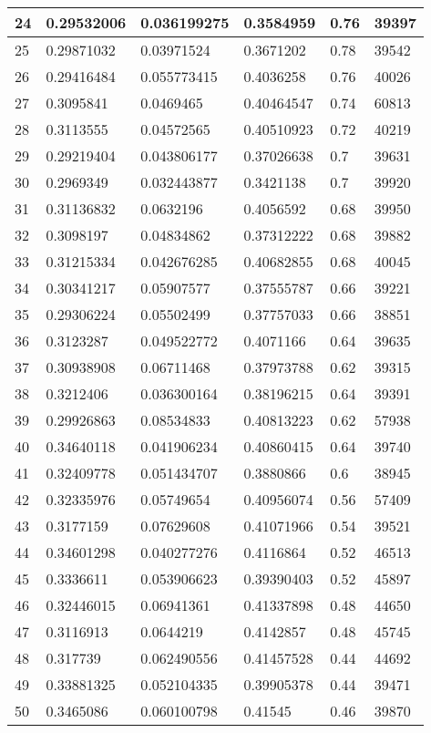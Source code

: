 \begin{longtable}{|l|l|l|l|l|l|}
24 & 0.29532006 & 0.036199275 & 0.3584959 & 0.76 & 39397 \\ \hline 
25 & 0.29871032 & 0.03971524 & 0.3671202 & 0.78 & 39542 \\ \hline 
26 & 0.29416484 & 0.055773415 & 0.4036258 & 0.76 & 40026 \\ \hline 
27 & 0.3095841 & 0.0469465 & 0.40464547 & 0.74 & 60813 \\ \hline 
28 & 0.3113555 & 0.04572565 & 0.40510923 & 0.72 & 40219 \\ \hline 
29 & 0.29219404 & 0.043806177 & 0.37026638 & 0.7 & 39631 \\ \hline 
30 & 0.2969349 & 0.032443877 & 0.3421138 & 0.7 & 39920 \\ \hline 
31 & 0.31136832 & 0.0632196 & 0.4056592 & 0.68 & 39950 \\ \hline 
32 & 0.3098197 & 0.04834862 & 0.37312222 & 0.68 & 39882 \\ \hline 
33 & 0.31215334 & 0.042676285 & 0.40682855 & 0.68 & 40045 \\ \hline 
34 & 0.30341217 & 0.05907577 & 0.37555787 & 0.66 & 39221 \\ \hline 
35 & 0.29306224 & 0.05502499 & 0.37757033 & 0.66 & 38851 \\ \hline 
36 & 0.3123287 & 0.049522772 & 0.4071166 & 0.64 & 39635 \\ \hline 
37 & 0.30938908 & 0.06711468 & 0.37973788 & 0.62 & 39315 \\ \hline 
38 & 0.3212406 & 0.036300164 & 0.38196215 & 0.64 & 39391 \\ \hline 
39 & 0.29926863 & 0.08534833 & 0.40813223 & 0.62 & 57938 \\ \hline 
40 & 0.34640118 & 0.041906234 & 0.40860415 & 0.64 & 39740 \\ \hline 
41 & 0.32409778 & 0.051434707 & 0.3880866 & 0.6 & 38945 \\ \hline 
42 & 0.32335976 & 0.05749654 & 0.40956074 & 0.56 & 57409 \\ \hline 
43 & 0.3177159 & 0.07629608 & 0.41071966 & 0.54 & 39521 \\ \hline 
44 & 0.34601298 & 0.040277276 & 0.4116864 & 0.52 & 46513 \\ \hline 
45 & 0.3336611 & 0.053906623 & 0.39390403 & 0.52 & 45897 \\ \hline 
46 & 0.32446015 & 0.06941361 & 0.41337898 & 0.48 & 44650 \\ \hline 
47 & 0.3116913 & 0.0644219 & 0.4142857 & 0.48 & 45745 \\ \hline 
48 & 0.317739 & 0.062490556 & 0.41457528 & 0.44 & 44692 \\ \hline 
49 & 0.33881325 & 0.052104335 & 0.39905378 & 0.44 & 39471 \\ \hline 
50 & 0.3465086 & 0.060100798 & 0.41545 & 0.46 & 39870 \\ \hline 
\end{longtable}